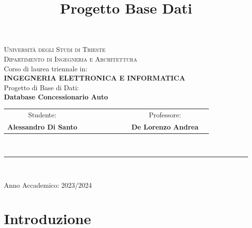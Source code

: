\documentclass[12pt,a4paper]{article}
\title{Progetto Base Dati}
\author{}
\begin{document}
	\begin{titlepage}
		
		\begin{center}
			
			\textsc{\LARGE Università degli Studi di Trieste}\\[0.25cm] 
			\textsc{\large Dipartimento di Ingegneria e Architettura}\\[2.0cm] 
			
			{\large	Corso di laurea triennale in:}\\[0.25 cm]
			{\large \bfseries INGEGNERIA ELETTRONICA E INFORMATICA}
			\\[2 cm]
			{\large  Progetto di Base di Dati: }\\[0.25cm]
			{\large \bfseries Database Concessionario Auto}\\ [0.2 cm]
			
			
			
			\vfill
			
				\begin{table}[h]
					{\large
						\begin{tabular}{c c c c l c c c c r}
							Studente: & & & & & & & &  Professore: \\
							\bfseries Alessandro Di Santo & & & & & & & &   \bfseries De Lorenzo Andrea 
						\end{tabular}
					}
				\end{table}
			
			
				
			
			~
		
			
		
			\vspace{.1\linewidth}
			
			\rule{.4\textwidth}{.10pt}
			\\[0.2 cm]
			
				{\large \par	
					Anno Accademico: 2023/2024\\
					\par}
				
			
			
		\end{center}
	\end{titlepage}
\newpage
\tableofcontents
\newpage

\section{Introduzione}
\end{document}
